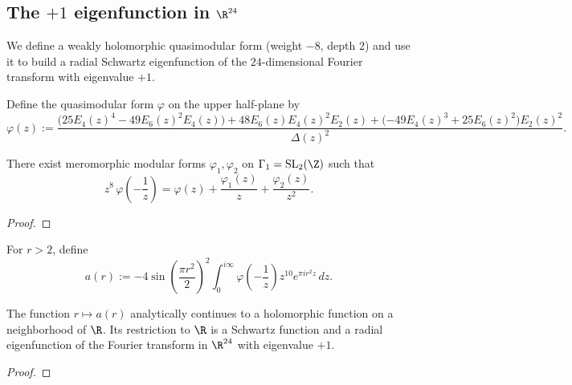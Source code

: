 \subsection{The $+1$ eigenfunction in $\R^{24}$}

We define a weakly holomorphic quasimodular form (weight $-8$, depth $2$) and use it to build a radial Schwartz eigenfunction of the $24$-dimensional Fourier transform with eigenvalue $+1$.

\begin{definition}\label{def:varphi-d24}\leanok
  Define the quasimodular form $\varphi$ on the upper half-plane by
  \begin{equation}\label{eq:d24-phidef}
  \varphi(z)
  := \frac{\big(25E_4(z)^4 - 49E_6(z)^2E_4(z)\big) + 48E_6(z)E_4(z)^2E_2(z) + \big({-49}E_4(z)^3 + 25E_6(z)^2\big)E_2(z)^2}{\Delta(z)^2}.
  \end{equation}
\end{definition}

\begin{lemma}\label{lem:varphi-quasimodular-d24}\leanok
  There exist meromorphic modular forms $\varphi_1,\varphi_2$ on $\Gamma_1=\mathrm{SL}_2(\Z)$ such that
  \begin{equation}\label{eq:d24-quasimodular}
    z^8\,\varphi\!\left(-\frac{1}{z}\right)=\varphi(z)+\frac{\varphi_1(z)}{z}+\frac{\varphi_2(z)}{z^2}.
  \end{equation}
\end{lemma}
\begin{proof}\leanok
\end{proof}

\begin{definition}\label{def:a-d24}\leanok
  For $r>2$, define
  \begin{equation}\label{eq:d24-adef}
    a(r) := -4\sin\!\left(\frac{\pi r^2}{2}\right)^{\!2}\int_{0}^{i\infty}\varphi\!\left(-\frac{1}{z}\right)z^{10}e^{\pi i r^2 z}\,dz.
  \end{equation}
\end{definition}

\begin{lemma}\label{lem:plusone-d24}\leanok
  The function $r\mapsto a(r)$ analytically continues to a holomorphic function on a neighborhood of $\R$.
  Its restriction to $\R$ is a Schwartz function and a radial eigenfunction of the Fourier transform in $\R^{24}$ with eigenvalue $+1$.
\end{lemma}
\begin{proof}\leanok
\end{proof}

